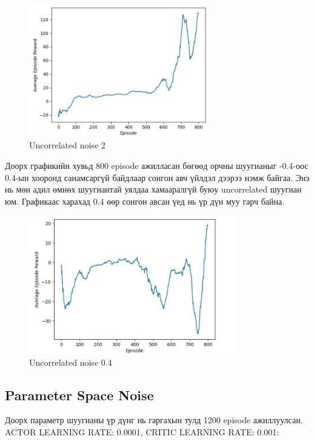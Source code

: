 \documentclass[12pt,A4]{report}
\begin{document}
\begin{figure}[H]
\centering
\includegraphics[width=0.7\textwidth]{./images/after_800_ep_02_am}
\caption{Uncorrelated noise 2}
\end{figure}

Доорх графикийн хувьд 800 episode ажилласан бөгөөд орчны шуугианыг -0.4-оос 0.4-ын хооронд санамсаргүй байдлаар сонгон авч үйлдэл дээрээ нэмж байгаа. Энэ нь мөн адил өмнөх шуугиантай уялдаа хамааралгүй буюу uncorrelated шуугиан юм. Графикаас харахад 0.4 өөр сонгон авсан үед нь үр дүн муу гарч байна.

\begin{figure}[H]
\centering
\includegraphics[width=0.8\textwidth]{./images/after_800_ep_04}
\caption{Uncorrelated noise 0.4}
\end{figure}

\subsection{Parameter Space Noise}

Доорх параметр шуугианы үр дүнг нь гаргахын тулд 1200 episode ажиллуулсан. ACTOR LEARNING RATE: 0.0001, CRITIC LEARNING RATE: 0.001:
\end{document}
